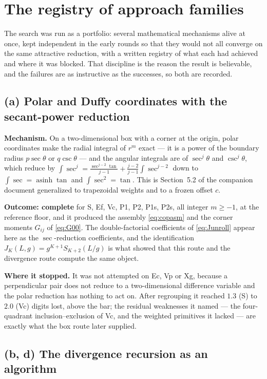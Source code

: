 \documentclass[11pt]{article}
\theoremstyle{remark}
\newcommand{\asinh}{\operatorname{asinh}}
\begin{document}
\section{The registry of approach families}
\label{sec:registry}

The search was run as a portfolio: several mathematical mechanisms alive at once, kept
independent in the early rounds so that they would not all converge on the same attractive
reduction, with a written registry of what each had achieved and where it was blocked. That
discipline is the reason the result is believable, and the failures are as instructive as
the successes, so both are recorded.

\subsection{(a) Polar and Duffy coordinates with the secant-power reduction}

\textbf{Mechanism.} On a two-dimensional box with a corner at the origin, polar coordinates
make the radial integral of $r^m$ exact --- it is a power of the boundary radius
$p\sec\theta$ or $q\csc\theta$ --- and the angular integrals are of $\sec^j\theta$ and
$\csc^j\theta$, which reduce by
$\int\sec^j = \frac{\sec^{j-2}\tan}{j-1} + \frac{j-2}{j-1}\int\sec^{j-2}$ down to
$\int\sec = \asinh\tan$ and $\int\sec^2 = \tan$. This is Section~5.2 of the companion
document generalized to trapezoidal weights and to a frozen offset $c$.

\textbf{Outcome: complete} for S, Ef, Vc, P1, P2, P1s, P2s, all integer $m \ge -1$, at the
reference floor, and it produced the assembly \eqref{eq:copasm} and the corner moments
$G_{ij}$ of \eqref{eq:G00}. The double-factorial coefficients of \eqref{eq:Junroll} appear
here as the $\sec$-reduction coefficients, and the identification
$J_K(L,g) = g^{K+1}S_{K+2}(L/g)$ is what showed that this route and the divergence route
compute the same object.

\textbf{Where it stopped.} It was not attempted on Ec, Vp or Xg, because a perpendicular
pair does not reduce to a two-dimensional difference variable and the polar reduction has
nothing to act on. After regrouping it reached $1.3$ (S) to $2.0$ (Vc) digits lost, above
the bar; the residual weaknesses it named --- the four-quadrant inclusion--exclusion of Vc,
and the weighted primitives it lacked --- are exactly what the box route later supplied.

\subsection{(b, d) The divergence recursion as an algorithm}
\end{document}
